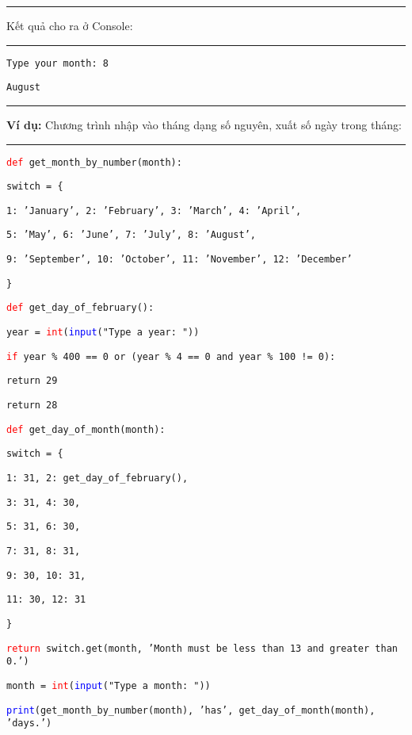 \rule{\linewidth}{0.2mm}\par
\noindent
\resetlinenumber
Kết quả cho ra ở Console:\\
\rule{\linewidth}{0.2mm}\par
\begin{linenumbers}
	\texttt{Type your month: 8}\par
	\texttt{August}\par
\end{linenumbers}
\rule{\linewidth}{0.2mm}\par
\resetlinenumber
\newpage
\textbf{Ví dụ:} Chương trình nhập vào tháng dạng số nguyên, xuất số ngày trong tháng:\\
\rule{\linewidth}{0.2mm}\par
\begin{linenumbers}
	\texttt{\textcolor{red}{def} get\_month\_by\_number(month):}\par
	\qquad \texttt{switch = \{}\par
	\qquad \qquad \texttt{1: 'January', 2: 'February', 3: 'March', 4: 'April', }\par
	\qquad \qquad \texttt{5: 'May', 6: 'June', 7: 'July', 8: 'August', }\par
	\qquad \qquad \texttt{9: 'September', 10: 'October', 11: 'November', 12: 'December'}\par
	\qquad \texttt{\}}\par
	\medskip
	\texttt{\textcolor{red}{def} get\_day\_of\_february():}\par
	\qquad \texttt{year = \textcolor{red}{int}(\textcolor{blue}{input}("Type a year: "))}\par
	\qquad \texttt{\textcolor{red}{if} year \% 400 == 0 or (year \% 4 == 0 and year \% 100 != 0):}\par
	\qquad \qquad \texttt{return 29}\par
	\qquad \texttt{return 28}\par
	\medskip
	\texttt{\textcolor{red}{def} get\_day\_of\_month(month):}\par
	\qquad \texttt{switch = \{}\par
	\qquad \qquad \texttt{1: 31, 2: get\_day\_of\_february(),}\par
	\qquad \qquad \texttt{3: 31, 4: 30,}\par
	\qquad \qquad \texttt{5: 31, 6: 30,}\par
	\qquad \qquad \texttt{7: 31, 8: 31,}\par
	\qquad \qquad \texttt{9: 30, 10: 31,}\par
	\qquad \qquad \texttt{11: 30, 12: 31}\par
	\qquad \texttt{\}}\par
	\qquad \texttt{\textcolor{red}{return}  switch.get(month, 'Month must be less than 13 and greater than 0.')}\par
	\medskip
	\texttt{month = \textcolor{red}{int}(\textcolor{blue}{input}("Type a month: "))}\par
	\texttt{\textcolor{blue}{print}(get\_month\_by\_number(month), 'has', get\_day\_of\_month(month), 'days.')}\par
\end{linenumbers}

